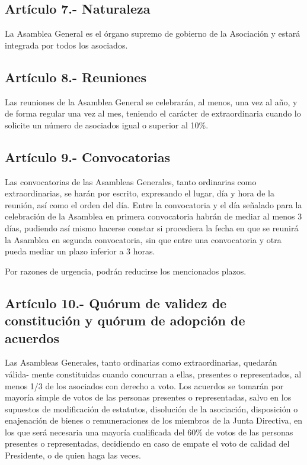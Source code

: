 \documentclass[12pt]{article}
\begin{document}
\subsection{Artículo 7.- Naturaleza}
La Asamblea General es el órgano supremo de gobierno de la Asociación y estará integrada por todos los asociados.

\subsection{Artículo 8.- Reuniones}
Las reuniones de la Asamblea General se celebrarán, al menos, una vez al año, y de forma regular una vez al mes, teniendo el carácter de extraordinaria cuando lo solicite un número de asociados igual o superior al 10\%.

\subsection{Artículo 9.- Convocatorias}
Las convocatorias de las Asambleas Generales, tanto ordinarias como extraordinarias, se harán por escrito, expresando el lugar, día y hora de la reunión, así como el orden del día. Entre la convocatoria y el día señalado para la celebración de la Asamblea en primera convocatoria habrán de mediar al menos 3 días, pudiendo así mismo hacerse constar si procediera la fecha en que se reunirá la Asamblea en segunda convocatoria, sin que entre una convocatoria y otra pueda mediar un plazo inferior a 3 horas.

Por razones de urgencia, podrán reducirse los mencionados plazos.

\subsection{Artículo 10.- Quórum de validez de constitución y quórum de adopción de acuerdos}
Las Asambleas Generales, tanto ordinarias como extraordinarias, quedarán válida- mente constituidas cuando concurran a ellas, presentes o representados, al menos 1/3 de los asociados con derecho a voto. Los acuerdos se tomarán por mayoría simple de votos de las personas presentes o representadas, salvo en los supuestos de modificación de estatutos, disolución de la asociación, disposición o enajenación de bienes o remuneraciones de los miembros de la Junta Directiva, en los que será necesaria una mayoría cualificada del 60\% de votos de las personas presentes o representadas, decidiendo en caso de empate el voto de calidad del Presidente, o de quien haga las veces.
\end{document}
